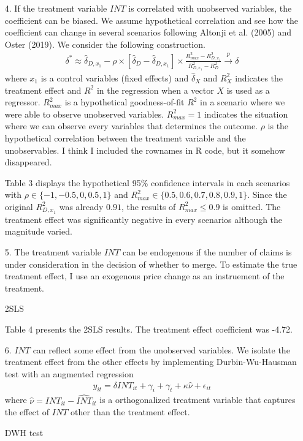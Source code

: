 \documentclass[12pt]{article}
\begin{document}
\begin{itemize}
	    	    		
		\item[4.] If the treatment variable $INT$ is correlated with unobserved variables, the coefficient can be biased. We assume hypothetical correlation and see how the coefficient can change in several scenarios following Altonji et al. (2005) and Oster (2019). We consider the following construction.
		\begin{eqnarray*}
			\delta^* \approx \hat{\delta}_{D,x_1} - \rho \times [\hat{\delta}_D - \hat{\delta}_{D,x_1}] \times \frac{R_{max}^2 - R_{D,x_1}^2}{R_{D,x_1}^2 - R_D^2} \xrightarrow{p} \delta
		\end{eqnarray*}
	where $x_1$ is a control variables (fixed effects) and $\hat{\delta}_X$ and $R^2_X$ indicates the treatment effect and $R^2$ in the regression when a vector $X$ is used as a regressor. $R_{max}^2$ is a hypothetical goodness-of-fit $R^2$ in a scenario where we were able to observe unobserved variables. $R_{max}^2 =1$ indicates the situation where we can observe every variables that determines the outcome. $\rho$ is the hypothetical correlation between the treatment variable and the unobservables. I think I included the rownames in R code, but it somehow disappeared.
	
		\begin{tiny}
    	    
		\end{tiny}
    
    	Table 3 displays the hypothetical 95\% confidence intervals in each scenarios with $\rho \in \{-1, -0.5, 0, 0.5, 1\}$ and $R_{max}^2 \in \{0.5, 0.6, 0.7, 0.8, 0.9, 1\}$. Since the original $R^2_{D,x_1}$ was already $0.91$, the results of $R_{max}^2 \le 0.9$ is omitted. The treatment effect was significantly negative in every scenarios although the magnitude varied.
    	
    	\item[5.] The treatment variable $INT$ can be endogenous if the number of claims is under consideration in the decision of whether to merge. To estimate the true treatment effect, I use an exogenous price change as an instruement of the treatment.
	\begin{table}[h]
    		
    		\caption{2SLS}
    	\end{table}
    
        Table 4 presents the 2SLS results. The treatment effect coefficient was -4.72.
				
		\item[6.] $INT$ can reflect some effect from the unobserved variables. We isolate the treatment effect from the other effects by implementing Durbin-Wu-Hausman test with an augmented regression
		\begin{eqnarray*}
			y_{it} = \delta INT_{it} + \gamma_i + \gamma_t + \kappa \hat{\nu} + \epsilon_{it}
		\end{eqnarray*}
	where $\hat{\nu} = INT_{it} - \hat{INT}_{it}$ is a orthogonalized treatment variable that captures the effect of $INT$ other than the treatment effect.
		\begin{table} [ht]
		
		\caption{DWH test}
	\end{table}


\end{itemize}
\end{document}
